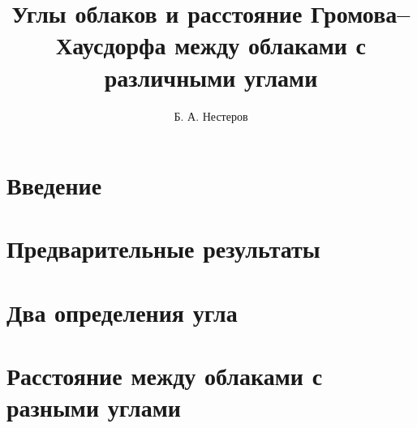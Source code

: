 \documentclass[11pt,twoside,draft
]{article}
\title
{%
  Углы облаков и расстояние Громова--Хаусдорфа между облаками с
  различными углами
}
{%
  Angles of clouds and the Gromov--Hausdorff distance between clouds
with different angles}
\author
{%
Б. А. Нестеров}
{%
B. A. Nesterov}
\begin{document}
\maketitle
\newpage
\tableofcontents
\newpage

\section{Введение}

\section{Предварительные результаты}


\section{Два определения угла}

\section{Расстояние между облаками с разными углами}

\label{end}


\end{document}
